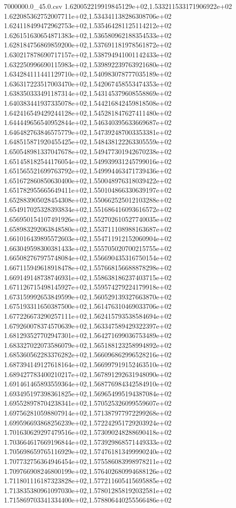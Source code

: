 \begin{filecontents*}{7000000.0_45.0.csv}
1.620052219919845129e+02,1.533211533171906922e+02
1.622085362752007711e+02,1.534341138286308706e+02
1.624118499472962753e+02,1.535464281125114212e+02
1.626151630654871383e+02,1.536580962188354533e+02
1.628184756869859200e+02,1.537691181978561872e+02
1.630217878690717157e+02,1.538794941001142433e+02
1.632250996690115983e+02,1.539892239763921680e+02
1.634284111441129710e+02,1.540983078777035189e+02
1.636317223517003470e+02,1.542067458553474353e+02
1.638350333491187314e+02,1.543145379608558869e+02
1.640383441937335078e+02,1.544216842459818508e+02
1.642416549429244128e+02,1.545281847627411480e+02
1.644449656540952844e+02,1.546340395633669687e+02
1.646482763846575779e+02,1.547392487003353381e+02
1.648515871920455425e+02,1.548438122263305559e+02
1.650548981337047678e+02,1.549477301942670238e+02
1.651458182544176054e+02,1.549939931245799016e+02
1.651565521699763792e+02,1.549994463471739436e+02
1.651672860850630400e+02,1.550048976318039422e+02
1.651782955665649411e+02,1.550104866330639197e+02
1.652883905028454308e+02,1.550662525012103288e+02
1.654917025328393834e+02,1.551686416093616572e+02
1.656950154107491926e+02,1.552702610527740035e+02
1.658983292063848580e+02,1.553711108988163687e+02
1.661016439895572603e+02,1.554711912152060904e+02
1.663049598300381433e+02,1.555705020700215755e+02
1.665082767975748084e+02,1.556690435316750154e+02
1.667115949618918478e+02,1.557668156688878298e+02
1.669149148738746931e+02,1.558638186237403715e+02
1.671126715498145927e+02,1.559574279224179918e+02
1.673159992653849599e+02,1.560529139327663870e+02
1.675193311650387500e+02,1.561476310469033706e+02
1.677226673290257111e+02,1.562415793538584694e+02
1.679260078374570639e+02,1.563347589429322397e+02
1.681293527702947301e+02,1.564271699036753489e+02
1.683327022073586079e+02,1.565188123258994892e+02
1.685360562283376282e+02,1.566096862996528216e+02
1.687394149127618164e+02,1.566997919152463510e+02
1.689427783400210217e+02,1.567891292631948090e+02
1.691461465893559364e+02,1.568776984342584910e+02
1.693495197398361825e+02,1.569654995194387084e+02
1.695528978704238341e+02,1.570525326099559607e+02
1.697562810598807914e+02,1.571387977972299268e+02
1.699596693868256239e+02,1.572242951729203924e+02
1.701630629297479516e+02,1.573090248288690418e+02
1.703664617669196844e+02,1.573929868571449333e+02
1.705698659765116929e+02,1.574761813499990240e+02
1.707732756364946454e+02,1.575586083998978211e+02
1.709766908246800199e+02,1.576402680994688126e+02
1.711801116187323828e+02,1.577211605415695885e+02
1.713835380961097030e+02,1.578012858192032581e+02
1.715869703341334400e+02,1.578806440255566486e+02

\end{filecontents*}
